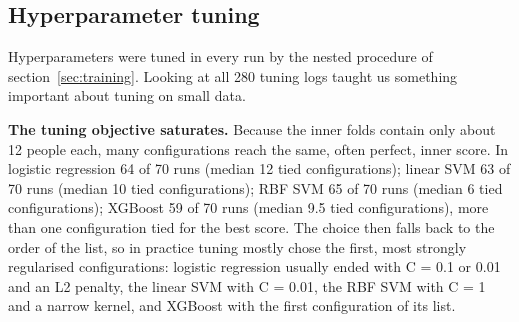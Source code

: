 \documentclass[11pt,a4paper]{article}
\begin{document}
\subsection{Hyperparameter tuning}\label{sec:tuning}
Hyperparameters were tuned in every run by the nested procedure of section~\ref{sec:training}. Looking at all 280 tuning logs taught us something important about tuning on small data.

\textbf{The tuning objective saturates.} Because the inner folds contain only about 12 people each, many configurations reach the same, often perfect, inner score. In logistic regression 64 of 70 runs (median 12 tied configurations); linear SVM 63 of 70 runs (median 10 tied configurations); RBF SVM 65 of 70 runs (median 6 tied configurations); XGBoost 59 of 70 runs (median 9.5 tied configurations), more than one configuration tied for the best score. The choice then falls back to the order of the list, so in practice tuning mostly chose the first, most strongly regularised configurations: logistic regression usually ended with C = 0.1 or 0.01 and an L2 penalty, the linear SVM with C = 0.01, the RBF SVM with C = 1 and a narrow kernel, and XGBoost with the first configuration of its list.
\end{document}

